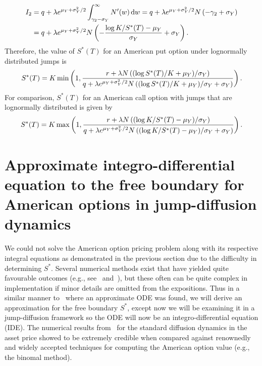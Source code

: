 	\begin{align*}
		I_2 &= q + \lambda e^{\mu_Y+\sigma_Y^2/2}\int_{\gamma_2 - \sigma_Y}^\infty N'(w) \, \mathrm d w = q + \lambda e^{\mu_Y+\sigma_Y^2/2}N\left(-\gamma_2 + \sigma_Y \right) \\
		&= q + \lambda e^{\mu_Y+\sigma_Y^2/2}N\left(-\frac{\log K/S^*(T) - \mu_Y}{\sigma_Y} + \sigma_Y \right).
	\end{align*}
Therefore, the value of $S^*(T)$ for an American put option under lognormally distributed jumps is
	\begin{equation}
		\label{eqn:freePutTLN}
		S^*(T) = K\min\left( 1, \frac{r + \lambda N \left(  (\log S^*(T)/K + \mu_Y)/\sigma_Y  \right)}{q + \lambda e^{\mu_Y+\sigma_Y^2/2}N\left((\log S^*(T)/K + \mu_Y)/\sigma_Y + \sigma_Y \right)}\right).
	\end{equation}
For comparison, $S^*(T)$ for an American call option with jumps that are lognormally distributed is given by~\cite{Chiarella2006}
		\begin{equation}
		\label{eqn:freeCallTLN}
		S^*(T) = K\max\left( 1, \frac{r + \lambda N \left(  (\log K/S^*(T) - \mu_Y)/\sigma_Y  \right)}{q + \lambda e^{\mu_Y+\sigma_Y^2/2}N\left((\log K/S^*(T) - \mu_Y)/\sigma_Y + \sigma_Y \right)}\right).
	\end{equation}
        	
        	\section{Approximate integro-differential equation to the free boundary for American options in jump-diffusion dynamics}
        	We could not solve the American option pricing problem along with its respective integral equations as demonstrated in the previous section due to the difficulty in determining $S^*$. Several numerical methods exist that have yielded quite favourable outcomes (e.g., see~\cite{Kallast2003} and~\cite{Chiarella2006}), but these often can be quite complex in implementation if minor details are omitted from the expositions. Thus in a similar manner to~\cite{Rodrigo2013} where an approximate ODE was found, we will derive an approximation for the free boundary $S^*$, except now we will be examining it in a jump-diffusion framework so the ODE will now be an integro-differential equation (IDE). The numerical results from~\cite{Rodrigo2013} for the standard diffusion dynamics in the asset price showed to be extremely credible when compared against renownedly and widely accepted techniques for computing the American option value (e.g., the binomal method).
        	
